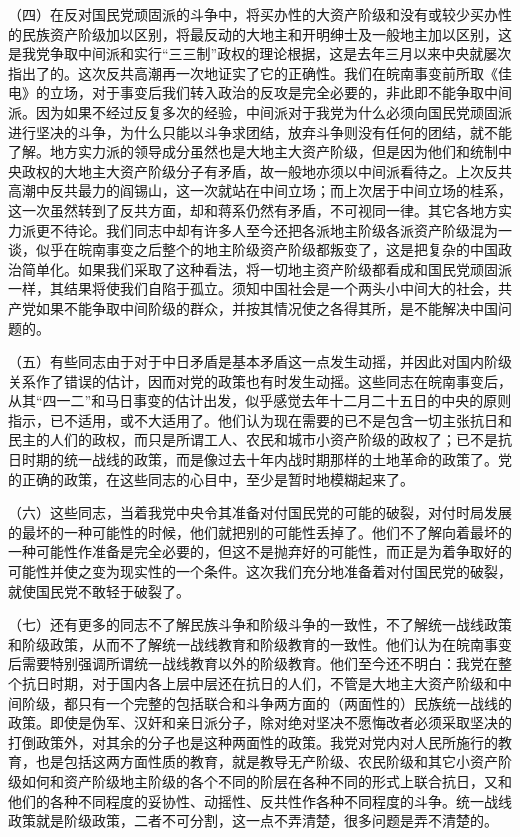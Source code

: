 （四）在反对国民党顽固派的斗争中，将买办性的大资产阶级和没有或较少买办性的民族资产阶级加以区别，将最反动的大地主和开明绅士及一般地主加以区别，这是我党争取中间派和实行“三三制”政权的理论根据，这是去年三月以来中央就屡次指出了的。这次反共高潮再一次地证实了它的正确性。我们在皖南事变前所取《佳电》的立场，对于事变后我们转入政治的反攻是完全必要的，非此即不能争取中间派。因为如果不经过反复多次的经验，中间派对于我党为什么必须向国民党顽固派进行坚决的斗争，为什么只能以斗争求团结，放弃斗争则没有任何的团结，就不能了解。地方实力派的领导成分虽然也是大地主大资产阶级，但是因为他们和统制中央政权的大地主大资产阶级分子有矛盾，故一般地亦须以中间派看待之。上次反共高潮中反共最力的阎锡山，这一次就站在中间立场；而上次居于中间立场的桂系，这一次虽然转到了反共方面，却和蒋系仍然有矛盾，不可视同一律。其它各地方实力派更不待论。我们同志中却有许多人至今还把各派地主阶级各派资产阶级混为一谈，似乎在皖南事变之后整个的地主阶级资产阶级都叛变了，这是把复杂的中国政治简单化。如果我们采取了这种看法，将一切地主资产阶级都看成和国民党顽固派一样，其结果将使我们自陷于孤立。须知中国社会是一个两头小中间大的社会，共产党如果不能争取中间阶级的群众，并按其情况使之各得其所，是不能解决中国问题的。

（五）有些同志由于对于中日矛盾是基本矛盾这一点发生动摇，并因此对国内阶级关系作了错误的估计，因而对党的政策也有时发生动摇。这些同志在皖南事变后，从其“四一二”和马日事变的估计出发，似乎感觉去年十二月二十五日的中央的原则指示，已不适用，或不大适用了。他们认为现在需要的已不是包含一切主张抗日和民主的人们的政权，而只是所谓工人、农民和城市小资产阶级的政权了；已不是抗日时期的统一战线的政策，而是像过去十年内战时期那样的土地革命的政策了。党的正确的政策，在这些同志的心目中，至少是暂时地模糊起来了。

（六）这些同志，当着我党中央令其准备对付国民党的可能的破裂，对付时局发展的最坏的一种可能性的时候，他们就把别的可能性丢掉了。他们不了解向着最坏的一种可能性作准备是完全必要的，但这不是抛弃好的可能性，而正是为着争取好的可能性并使之变为现实性的一个条件。这次我们充分地准备着对付国民党的破裂，就使国民党不敢轻于破裂了。

（七）还有更多的同志不了解民族斗争和阶级斗争的一致性，不了解统一战线政策和阶级政策，从而不了解统一战线教育和阶级教育的一致性。他们认为在皖南事变后需要特别强调所谓统一战线教育以外的阶级教育。他们至今还不明白：我党在整个抗日时期，对于国内各上层中层还在抗日的人们，不管是大地主大资产阶级和中间阶级，都只有一个完整的包括联合和斗争两方面的（两面性的）民族统一战线的政策。即使是伪军、汉奸和亲日派分子，除对绝对坚决不愿悔改者必须采取坚决的打倒政策外，对其余的分子也是这种两面性的政策。我党对党内对人民所施行的教育，也是包括这两方面性质的教育，就是教导无产阶级、农民阶级和其它小资产阶级如何和资产阶级地主阶级的各个不同的阶层在各种不同的形式上联合抗日，又和他们的各种不同程度的妥协性、动摇性、反共性作各种不同程度的斗争。统一战线政策就是阶级政策，二者不可分割，这一点不弄清楚，很多问题是弄不清楚的。

